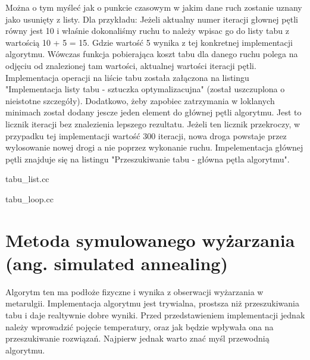 \documentclass[polish,polish,a4paper]{article}
\begin{document}
Można o tym myśleć jak o punkcie czasowym w jakim dane ruch zostanie uznany jako usunięty z listy. Dla przykładu:
Jeżeli aktualny numer iteracji głownej pętli równy jest 10 i właśnie dokonaliśmy ruchu to należy wpisac go do listy tabu z wartością
10 + 5 = 15. Gdzie wartość 5 wynika z tej konkretnej implementacji algorytmu. Wówczas funkcja pobierająca koszt tabu dla danego
ruchu polega na odjęciu od znalezionej tam wartości, aktualnej wartości iteracji pętli. Implementacja operacji na liście tabu
została załączona na listingu "Implementacja listy tabu - sztuczka optymalizacujna" (został uszczuplona o nieistotne szczegóły).
Dodatkowo, żeby zapobiec zatrzymania w loklanych minimach został dodany jescze jeden element do głównej pętli algorytmu.
Jest to licznik iteracji bez znalezienia lepszego rezultatu. Jeżeli ten licznik przekroczy, w przypadku tej implementacji wartość
300 iteracji, nowa droga powstaje przez wylosowanie nowej drogi a nie poprzez wykonanie ruchu. Impelementacja głównej pętli znajduje
się na listingu "Przeszukiwanie tabu - główna pętla algorytmu".

\pagebreak

{tabu_list.cc}

\pagebreak

{tabu_loop.cc}

\pagebreak
\section{Metoda symulowanego wyżarzania (ang. simulated annealing)}

Algorytm ten ma podłoże fizyczne i wynika z obserwacji wyżarzania w metarulgii. Implementacja algorytmu jest trywialna, prostsza niż
przeszukiwania tabu i daje realtywnie dobre wyniki. Przed przedstawieniem implementacji jednak należy wprowadzić pojęcie temperatury,
oraz jak będzie wpływała ona na przeszukiwanie rozwiązań. Najpierw jednak warto znać myśl przewodnią algorytmu.
\end{document}
